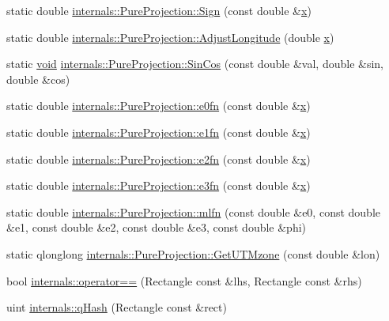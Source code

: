\begin{DoxyCompactItemize}
static double \hyperlink{group___o_p_map_widget_gaee27ced7a956221b25376a3a66d24225}{internals\-::\-Pure\-Projection\-::\-Sign} (const double \&\hyperlink{_o_p_plots_8m_a9336ebf25087d91c818ee6e9ec29f8c1}{x})
\item 
static double \hyperlink{group___o_p_map_widget_gafa614e10aa8fca4d1efadf7dd2afe24f}{internals\-::\-Pure\-Projection\-::\-Adjust\-Longitude} (double \hyperlink{_o_p_plots_8m_a9336ebf25087d91c818ee6e9ec29f8c1}{x})
\item 
static \hyperlink{group___u_a_v_objects_plugin_ga444cf2ff3f0ecbe028adce838d373f5c}{void} \hyperlink{group___o_p_map_widget_gac2ded9931569402c0332f2eb88775291}{internals\-::\-Pure\-Projection\-::\-Sin\-Cos} (const double \&val, double \&sin, double \&cos)
\item 
static double \hyperlink{group___o_p_map_widget_ga1431f7528de2f5e7e46a1fc112e57d9e}{internals\-::\-Pure\-Projection\-::e0fn} (const double \&\hyperlink{_o_p_plots_8m_a9336ebf25087d91c818ee6e9ec29f8c1}{x})
\item 
static double \hyperlink{group___o_p_map_widget_ga3887fec80271d2bb2ad73cd33cd133f6}{internals\-::\-Pure\-Projection\-::e1fn} (const double \&\hyperlink{_o_p_plots_8m_a9336ebf25087d91c818ee6e9ec29f8c1}{x})
\item 
static double \hyperlink{group___o_p_map_widget_gaf1cb887c1701e60dd8e1b86620fdfc0e}{internals\-::\-Pure\-Projection\-::e2fn} (const double \&\hyperlink{_o_p_plots_8m_a9336ebf25087d91c818ee6e9ec29f8c1}{x})
\item 
static double \hyperlink{group___o_p_map_widget_ga42266b37884ed2a7b650fdd830dd2ce2}{internals\-::\-Pure\-Projection\-::e3fn} (const double \&\hyperlink{_o_p_plots_8m_a9336ebf25087d91c818ee6e9ec29f8c1}{x})
\item 
static double \hyperlink{group___o_p_map_widget_ga5be16c4bd50c6869390aa8e1fa81d44d}{internals\-::\-Pure\-Projection\-::mlfn} (const double \&e0, const double \&e1, const double \&e2, const double \&e3, const double \&phi)
\item 
static qlonglong \hyperlink{group___o_p_map_widget_ga4fe99842f3ee0de090c40b11999ab860}{internals\-::\-Pure\-Projection\-::\-Get\-U\-T\-Mzone} (const double \&lon)
\item 
bool \hyperlink{group___o_p_map_widget_ga21e50fddd3ab15ded36e81275f3cac32}{internals\-::operator==} (\-Rectangle const \&lhs, \-Rectangle const \&rhs)
\item 
uint \hyperlink{group___o_p_map_widget_ga3b14f5cf9824e116a9b2dbd3aceaf7c3}{internals\-::q\-Hash} (\-Rectangle const \&rect)

\end{DoxyCompactItemize}

